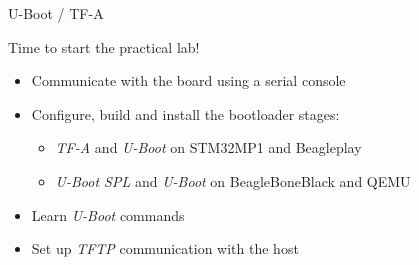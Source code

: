 \setuplabframe
{U-Boot / TF-A}
{
  Time to start the practical lab!
  \begin{itemize}
  \item Communicate with the board using a serial console
  \item Configure, build and install the bootloader stages:
        \begin{itemize}
                \item {\em TF-A} and {\em U-Boot} on STM32MP1 and Beagleplay
                \item {\em U-Boot SPL} and {\em U-Boot} on BeagleBoneBlack and QEMU
        \end{itemize}
  \item Learn {\em U-Boot} commands
  \item Set up {\em TFTP} communication with the host
  \end{itemize}
}
